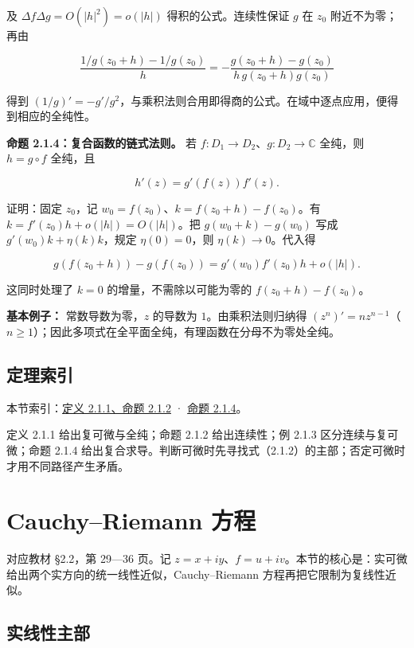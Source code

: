 \documentclass[11pt,a4paper]{article}
\begin{document}
及 \(\Delta f\Delta g=O(|h|^2)=o(|h|)\) 得积的公式。连续性保证 \(g\) 在
\(z_0\) 附近不为零；再由

\[
\frac{1/g(z_0+h)-1/g(z_0)}h
=-\frac{g(z_0+h)-g(z_0)}{h\,g(z_0+h)g(z_0)}
\]

得到
\((1/g)'=-g'/g^2\)，与乘积法则合用即得商的公式。在域中逐点应用，便得到相应的全纯性。

\textbf{命题 2.1.4：复合函数的链式法则。} 若
\(f:D_1\to D_2\)、\(g:D_2\to\mathbb C\) 全纯，则 \(h=g\circ f\) 全纯，且

\[
h'(z)=g'(f(z))f'(z).
\]

证明：固定 \(z_0\)，记 \(w_0=f(z_0)\)、\(k=f(z_0+h)-f(z_0)\)。有
\(k=f'(z_0)h+o(|h|)=O(|h|)\)。把 \(g(w_0+k)-g(w_0)\) 写成
\(g'(w_0)k+\eta(k)k\)，规定 \(\eta(0)=0\)，则 \(\eta(k)\to0\)。代入得

\[
g(f(z_0+h))-g(f(z_0))=g'(w_0)f'(z_0)h+o(|h|).
\]

这同时处理了 \(k=0\) 的增量，不需除以可能为零的 \(f(z_0+h)-f(z_0)\)。

\textbf{基本例子：} 常数导数为零，\(z\) 的导数为 \(1\)。由乘积法则归纳得
\((z^n)'=nz^{n-1}\)（\(n\ge1\)）；因此多项式在全平面全纯，有理函数在分母不为零处全纯。

\subsection{定理索引}\label{ch02-s1-ux5b9aux7406ux7d22ux5f15}

本节索引：\hyperref[ch02-s1-ux5b9aux4e49ux4e0eux7ebfux6027ux4e3bux90e8]{定义
2.1.1、命题 2.1.2} · \hyperref[ch02-s1-ux5bfcux6570ux7684ux8fd0ux7b97]{命题
2.1.4}。

定义 2.1.1 给出复可微与全纯；命题 2.1.2 给出连续性；例 2.1.3
区分连续与复可微；命题 2.1.4
给出复合求导。判断可微时先寻找式（2.1.2）的主部；否定可微时才用不同路径产生矛盾。

\section{Cauchy–Riemann 方程}
对应教材 §2.2，第 29---36 页。记
\(z=x+iy\)、\(f=u+iv\)。本节的核心是：实可微给出两个实方向的统一线性近似，Cauchy--Riemann
方程再把它限制为复线性近似。

\subsection{实线性主部}\label{ch02-s2-ux5b9eux7ebfux6027ux4e3bux90e8}
\end{document}
